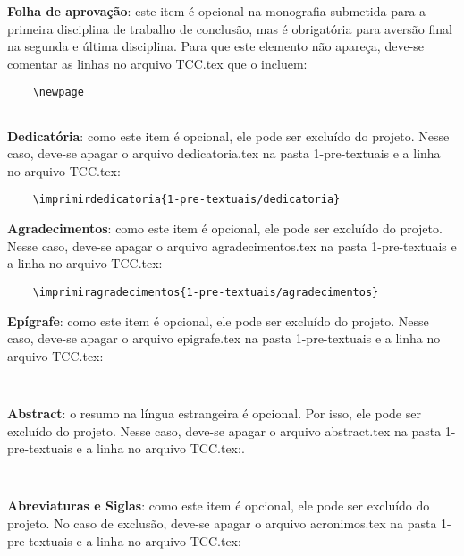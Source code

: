 \begin{alineas}
	\item \textbf{Folha de aprovação}: este item é opcional na monografia submetida para a primeira disciplina de trabalho de conclusão, mas é obrigatória para aversão final na segunda e última disciplina. Para que este elemento não apareça, deve-se comentar as linhas no arquivo TCC.tex que o incluem:
	\begingroup
	\begin{verbatim}
    \newpage
    
	\end{verbatim}
	\endgroup
	\item \textbf{Dedicatória}: como este item é opcional, ele pode ser excluído do projeto. Nesse caso, deve-se apagar o arquivo dedicatoria.tex na pasta 1-pre-textuais e a linha no arquivo TCC.tex:
	\begingroup
	\begin{verbatim}
    \imprimirdedicatoria{1-pre-textuais/dedicatoria}
	\end{verbatim}
	\endgroup
	\item \textbf{Agradecimentos}: como este item é opcional, ele pode ser excluído do projeto. Nesse caso, deve-se apagar o arquivo agradecimentos.tex na pasta 1-pre-textuais e a linha no arquivo TCC.tex:
	\begingroup
	\begin{verbatim}
    \imprimiragradecimentos{1-pre-textuais/agradecimentos}
	\end{verbatim}
	\endgroup        
	\item \textbf{Epígrafe}: como este item é opcional, ele pode ser excluído do projeto. Nesse caso, deve-se apagar o arquivo epigrafe.tex na pasta 1-pre-textuais e a linha no arquivo TCC.tex:
	\begingroup
	\begin{verbatim}
    
	\end{verbatim}
	\endgroup   
	\item \textbf{Abstract}: o resumo na língua estrangeira é opcional. Por isso, ele pode ser excluído do projeto. Nesse caso, deve-se apagar o arquivo abstract.tex na pasta 1-pre-textuais e a linha no arquivo TCC.tex:.
	\begingroup
	\begin{verbatim}
    
	\end{verbatim}
	\endgroup   
	\item \textbf{Abreviaturas e Siglas}: como este item é opcional, ele pode ser excluído do projeto. No caso de exclusão, deve-se apagar o arquivo acronimos.tex na pasta 1-pre-textuais e a linha no arquivo TCC.tex:
	\begingroup
	\begin{verbatim}

\end{verbatim}
\end{alineas}
